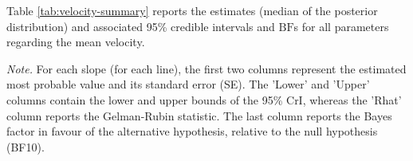 \documentclass[
  11pt,
  english,
  ,doc,mask,floatsintext]{apa6}
\newenvironment{lltable}{\begin{landscape}\centering\begin{ThreePartTable}}{\end{ThreePartTable}\end{landscape}}
\begin{document}
Table \ref{tab:velocity-summary} reports the estimates (median of the posterior distribution) and associated 95\% credible intervals and \(\text{BF}\)s for all parameters regarding the mean velocity.

\begin{lltable}

\begin{TableNotes}[para]
\normalsize{\textit{Note.} For each slope (for each line), the first two columns represent the
    estimated most probable value and its standard error (SE). The 'Lower' and
    'Upper' columns contain the lower and upper bounds of the 95\% CrI, whereas
    the 'Rhat' column reports the Gelman-Rubin statistic. The last column reports
    the Bayes factor in favour of the alternative hypothesis, relative to the
    null hypothesis (BF10).}
\end{TableNotes}

\scriptsize{

}
\end{lltable}
\end{document}

